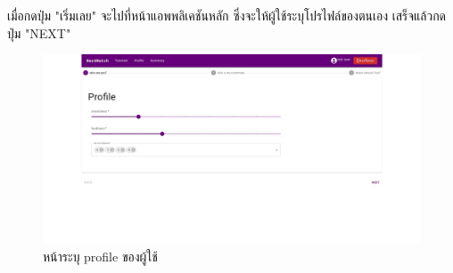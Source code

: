 %
\newline
เมื่อกดปุ่ม "เริ่มเลย" จะไปที่หน้าแอพพลิเคชันหลัก ซึ่งจะให้ผู้ใช้ระบุโปรไฟล์ของตนเอง
เสร็จแล้วกดปุ่ม "NEXT"
\begin{figure}[h]
  \begin{center}
    \includegraphics[width=\linewidth]{photo/web/student/profile-def.jpeg}
  \end{center}
  \caption{หน้าระบุ profile ของผู้ใช้}
\end{figure}
\newpage

